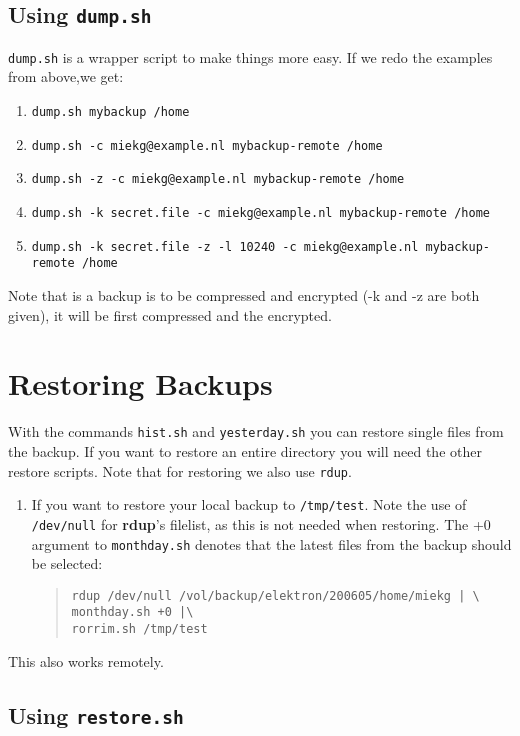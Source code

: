 \documentclass[a4paper, openany]{memoir}
\newcommand{\rdup}{\textbf{rdup}}
\newcommand{\cmd}[1]{\texttt{#1}}
\newcommand{\path}[1]{\texttt{#1}}
\begin{document}
\section{Using \cmd{dump.sh}}
\cmd{dump.sh} is a wrapper script to make things more easy. If we redo
the examples from above,we get:
\begin{enumerate}
\item{\cmd{dump.sh mybackup /home}}
\item{\cmd{dump.sh -c miekg@example.nl mybackup-remote /home}}
\item{\cmd{dump.sh -z -c miekg@example.nl mybackup-remote /home}}
\item{\cmd{dump.sh -k secret.file -c miekg@example.nl mybackup-remote /home}}
\item{\cmd{dump.sh -k secret.file -z -l 10240 -c miekg@example.nl mybackup-remote /home}}
\end{enumerate}
Note that is a backup is to be compressed and encrypted (-k and -z are
both given), it will be first compressed and the encrypted.

\chapter{Restoring Backups}
With the commands \cmd{hist.sh} and \cmd{yesterday.sh} you can restore
single files from the backup. If you want to restore an entire directory
you will need the other restore scripts. Note that for restoring we
also use \cmd{rdup}.

\begin{enumerate}
\item
If you want to restore your local backup to \path{/tmp/test}.
Note the use of \path{/dev/null} for \rdup's filelist, as this is not
needed when restoring. The +0 argument to \cmd{monthday.sh} denotes
that the latest files from the backup should be selected:
\begin{quote}
\begin{verbatim}
rdup /dev/null /vol/backup/elektron/200605/home/miekg | \
monthday.sh +0 |\
rorrim.sh /tmp/test
\end{verbatim}
\end{quote}
\end{enumerate}

This also works remotely.


\section{Using \cmd{restore.sh}}
\end{document}

